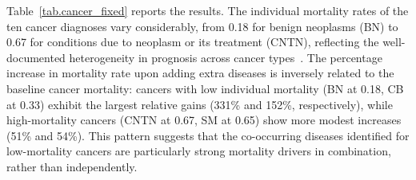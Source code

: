 \begin{table}[htbp]
\centering
{}
\caption{Optimal Cancer-Anchored Cliques Formed by the Addition of
Other Diseases}
\label{tab.cancer_fixed}
\end{table}

Table~\ref{tab.cancer_fixed} reports the results. The individual
mortality rates of the ten cancer diagnoses vary considerably, from
0.18 for benign neoplasms (BN) to 0.67 for conditions due to neoplasm
or its treatment (CNTN), reflecting the well-documented heterogeneity
in prognosis across cancer types~\citep{Earle2008}. The percentage
increase in mortality rate upon adding extra diseases is
inversely related to the baseline cancer mortality: cancers with low
individual mortality (BN at 0.18, CB at 0.33) exhibit the largest
relative gains (331\% and 152\%, respectively), while high-mortality
cancers (CNTN at 0.67, SM at 0.65) show more modest increases (51\%
and 54\%). This pattern suggests that the co-occurring diseases
identified for low-mortality cancers are particularly strong mortality
drivers in combination, rather than independently.

